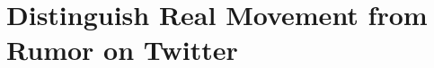 
\chapter{Distinguish Real Movement from Rumor on Twitter}

\begingroup
\newcommand{\score}{S}
\newcommand{\myalgo}{CoolAlgo}

%









\endgroup
